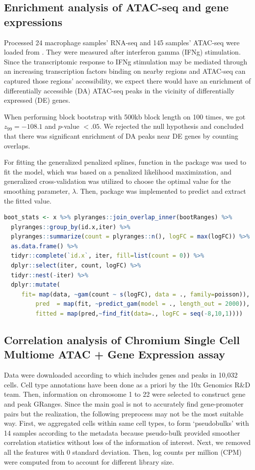 \documentclass{article}
\begin{document}
\subsection{Enrichment analysis of ATAC-seq and gene expressions}\label{sec:splines}
Processed 24 macrophage samples' RNA-seq  and 145 samples' ATAC-seq were loaded from \citep{lee2020fluent}. They were measured after interferon gamma (IFNg) stimulation. Since the transcriptomic response to IFNg stimulation may be mediated through an increasing transcription factors binding on nearby regions and ATAC-seq can captured those regions' accessibility, we expect there would have an enrichment of differentially accessible (DA) ATAC-seq peaks in the vicinity of differentially expressed (DE) genes. 

When performing block bootstrap with 500kb block length on 100 times, we got $z_{99}=-108.1$ and $\textit{p}$-value $<.05$. We rejected the null hypothesis and concluded that there was significant enrichment of DA peaks near DE genes by counting overlaps.

For fitting the generalized penalized splines,  function in the  package was used to fit the model, which was based on a penalized likelihood maximization, and generalized cross-validation was utilized to choose the optimal value for the smoothing parameter, $\lambda$. Then,  package was implemented to predict and extract the fitted value. 

\begin{lstlisting}[language=R]
boot_stats <- x %>% plyranges::join_overlap_inner(bootRanges) %>%
  plyranges::group_by(id.x,iter) %>%
  plyranges::summarize(count = plyranges::n(), logFC = max(logFC)) %>%
  as.data.frame() %>%
  tidyr::complete(`id.x`, iter, fill=list(count = 0)) %>%
  dplyr::select(iter, count, logFC) %>%
  tidyr::nest(-iter) %>%
  dplyr::mutate(
	 fit= map(data, ~gam(count ~ s(logFC), data = ., family=poisson)),
         pred  = map(fit, ~predict_gam(model = ., length_out = 2000)),
         fitted = map(pred,~find_fit(data=., logFC = seq(-8,10,1))))

\end{lstlisting} 

\subsection{Correlation analysis of Chromium Single Cell Multiome ATAC + Gene Expression assay}
Data were downloaded according to \citet{Vignette} which includes genes and peaks in 10,032 cells. 
Cell type annotations have been done as a priori by the 10x Genomics R\&D team. 
Then, information on chromosome 1 to 22 were selected to construct gene and peak GRanges. 
Since the main goal is not to accurately find gene-promoter pairs but the realization, the following preprocess may not be the most suitable way. 
First, we aggregated cells within same cell types, to form ‘pseudobulks’ with 14 samples according to the metadata because pseudo-bulk provided smoother correlation statistics without loss of the information of interest. 
Next, we removed all the features with 0 standard deviation. 
Then, log counts per million (CPM) were computed from  to account for different library size.
\end{document}
